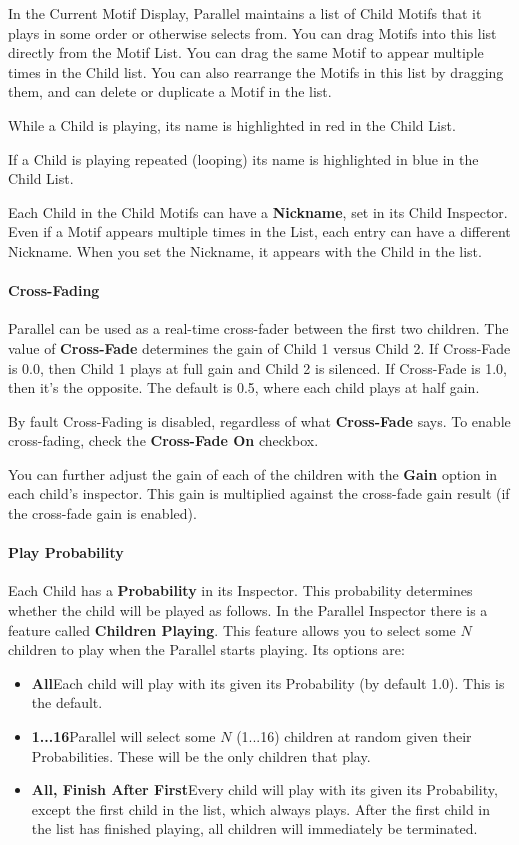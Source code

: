 \documentclass[twoside,10pt]{article}
\begin{document}
In the Current Motif Display, Parallel maintains a list of Child Motifs that it plays in some order or otherwise selects from.  You can drag Motifs into this list directly from the Motif List.  You can drag the same Motif to appear multiple times in the Child list.  You can also rearrange the Motifs in this list by dragging them, and can delete or duplicate a Motif in the list.

While a Child is playing, its name is highlighted in red in the Child List.

If a Child is playing repeated (looping) its name is highlighted in blue in the Child List.

Each Child in the Child Motifs can have a {\bf Nickname}, set in its Child Inspector.  Even if a Motif appears multiple times in the List, each entry can have a different Nickname.  When you set the Nickname, it appears with the Child in the list.

\paragraph{Cross-Fading}

Parallel can be used as a real-time cross-fader between the first two children.  The value of {\bf Cross-Fade} determines the gain of Child 1 versus Child 2.  If Cross-Fade is 0.0, then Child 1 plays at full gain and Child 2 is silenced.  If Cross-Fade is 1.0, then it's the opposite.  The default is 0.5, where each child plays at half gain.

By fault Cross-Fading is disabled, regardless of what {\bf Cross-Fade} says.  To enable cross-fading, check the {\bf Cross-Fade On} checkbox.

You can further adjust the gain of each of the children with the {\bf Gain} option in each child's inspector.  This gain is multiplied against the cross-fade gain result (if the cross-fade gain is enabled).

\paragraph{Play Probability}

Each Child has a {\bf Probability} in its Inspector.  This probability determines whether the child will be played as follows.  In the Parallel Inspector there is a feature called {\bf Children Playing}.  This feature allows you to select some \(N\) children to play when the Parallel starts playing.  Its options are:

\begin{itemize}
\item {\bf All}\quad Each child will play with its given its Probability (by default 1.0).  This is the default.
\item {\bf 1...16}\quad Parallel will select some \(N\) (1...16) children at random given their Probabilities.  These will be the only children that play.
\item {\bf All, Finish After First}\quad Every child will play with its given its Probability, except the first child in the list, which always plays.  After the first child in the list has finished playing, all children will immediately be terminated.
\end{itemize}
\end{document}

